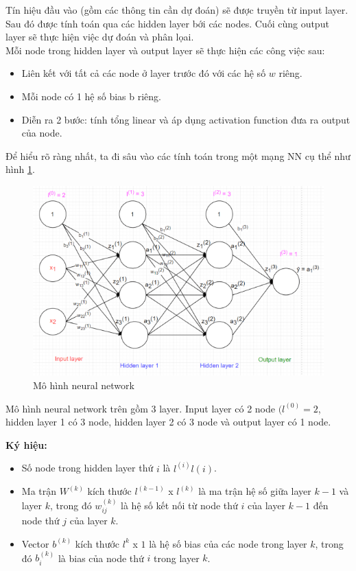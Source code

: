Tín hiệu đầu vào (gồm các thông tin cần dự đoán) sẽ được truyền từ input layer. Sau đó được tính toán qua các hidden layer bới các nodes. Cuối cùng output layer sẽ thực hiện việc dự đoán và phân lọai.\\

Mỗi node trong hidden layer và output layer sẽ thực hiện các công việc sau:
\begin{itemize}
\item Liên kết với tất cả các node ở layer trước đó với các hệ số $w$ riêng.
\item Mỗi node có 1 hệ số bias b riêng.
\item Diễn ra 2 bước: tính tổng linear và áp dụng activation function đưa ra output của node.
\end{itemize}

Để hiểu rõ ràng nhất, ta đi sâu vào các tính toán trong một mạng NN cụ thể như hình \ref{fig:NN}.\\

\FloatBarrier
\begin{figure}[htp]
\begin{center}
\includegraphics[scale=1]{chap2/c2_figs/nn_full-2.png}
\end{center}
\caption{Mô hình neural network}
\label{fig:NN}
\end{figure}
\FloatBarrier
Mô hình neural network trên gồm 3 layer. Input layer có 2 node $(l^{(0)} = 2$, hidden layer 1 có 3 node, hidden layer 2 có 3 node và output layer có 1 node.

\textbf{Ký hiệu:}
\begin{itemize}
\item Số node trong hidden layer thứ $i$ là $l^{(i)}l(i)$.

\item Ma trận $W^{(k)}$ kích thước $l^{(k-1)}$ x $ l^{(k)}$ là ma trận hệ số giữa layer $k-1$ và layer $k$, trong đó $w_{ij}^{(k)}$ là hệ số kết nối từ node thứ $i$ của layer $k-1$ đến node thứ $j$ của layer $k$.

\item Vector $b^{(k)}$ kích thước $l^{k}$ x $1$ là hệ số bias của các node trong layer $k$, trong đó $b_i^{(k)}$ là bias của node thứ $i$ trong layer $k$. 
\end{itemize}


